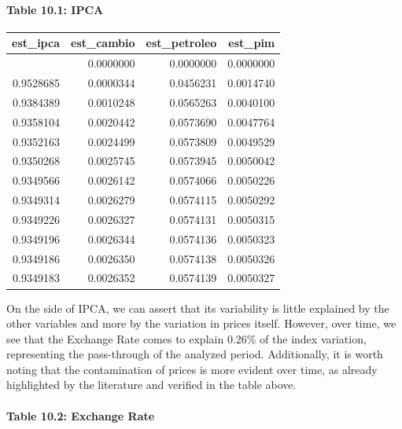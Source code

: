 \documentclass[12pt]{article}
\begin{document}
\hypertarget{table-10.1-ipca}{%
\paragraph{Table 10.1: IPCA}\label{table-10.1-ipca}}

\begin{longtable}[]{@{}rrrr@{}}
\toprule\noalign{}
est\_ipca & est\_cambio & est\_petroleo & est\_pim \\
\midrule\noalign{}
\endhead
\bottomrule\noalign{}
\endlastfoot
1.0000000 & 0.0000000 & 0.0000000 & 0.0000000 \\
0.9528685 & 0.0000344 & 0.0456231 & 0.0014740 \\
0.9384389 & 0.0010248 & 0.0565263 & 0.0040100 \\
0.9358104 & 0.0020442 & 0.0573690 & 0.0047764 \\
0.9352163 & 0.0024499 & 0.0573809 & 0.0049529 \\
0.9350268 & 0.0025745 & 0.0573945 & 0.0050042 \\
0.9349566 & 0.0026142 & 0.0574066 & 0.0050226 \\
0.9349314 & 0.0026279 & 0.0574115 & 0.0050292 \\
0.9349226 & 0.0026327 & 0.0574131 & 0.0050315 \\
0.9349196 & 0.0026344 & 0.0574136 & 0.0050323 \\
0.9349186 & 0.0026350 & 0.0574138 & 0.0050326 \\
0.9349183 & 0.0026352 & 0.0574139 & 0.0050327 \\
\end{longtable}

On the side of IPCA, we can assert that its variability is little
explained by the other variables and more by the variation in prices
itself. However, over time, we see that the Exchange Rate comes to
explain 0.26\% of the index variation, representing the pass-through of
the analyzed period. Additionally, it is worth noting that the
contamination of prices is more evident over time, as already
highlighted by the literature and verified in the table above.

\hypertarget{table-10.2-exchange-rate}{%
\paragraph{Table 10.2: Exchange Rate}\label{table-10.2-exchange-rate}}
\end{document}
